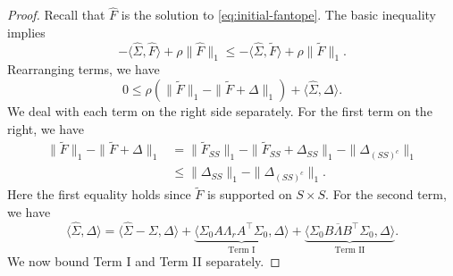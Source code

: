 \documentclass[11pt]{article}
\newcommand{\LambdaRest}{\overline{\Lambda}} %
\newcommand{\0}{{\mathbf{0}}}
\newcommand{\tF}{{\widetilde{F}}}
\begin{document}
\begin{proof}
Recall that $\widehat{F}$ is the solution to \eqref{eq:initial-fantope}.
The basic inequality implies 
\begin{equation*}
    {-\langle \widehat{\Sigma},\widehat{F}\rangle +\rho\|\widehat{F}\|_1\leq -\langle \widehat{\Sigma},\widetilde{F}\rangle +\rho\|\widetilde{F}\|_1.}
\end{equation*}
Rearranging terms, we have
\begin{equation}
      \label{eq:basic-ineq-1}
    0\leq \rho(\|\tF\|_1-\|\tF+\Delta\|_1)+\langle \widehat{\Sigma},\Delta\rangle.
\end{equation}
We deal with each term on the right side separately. 
For the first term on the right, we have
\begin{equation}
      \label{eq:basic-ineq-2}
\begin{aligned}    \|\tF\|_1-\|\tF+\Delta\|_1&=\|\tF_{SS}\|_1-\|\tF_{SS}+\Delta_{SS}\|_1-\|\Delta_{(SS)^c}\|_1\\
    &\leq \|\Delta_{SS}\|_1-\|\Delta_{{(SS)}^c}\|_1.
\end{aligned}
\end{equation}
Here the first equality holds since $\tF$ is supported on $S\times S$.
For the second term, we have
\begin{equation}
      \label{eq:basic-ineq-3}
    \langle \widehat{\Sigma},\Delta\rangle = \langle\widehat{\Sigma}-\Sigma,\Delta\rangle+\underbrace{\langle \Sigma_0A\Lambda_rA^\top\Sigma_0,\Delta\rangle}_{\text{Term I}} +\underbrace{\langle \Sigma_0B\LambdaRest B^\top\Sigma_0,\Delta\rangle}_{\text{Term II}}.
\end{equation}
We now bound Term I and Term II separately. 

\smallskip


\end{proof}
\end{document}
